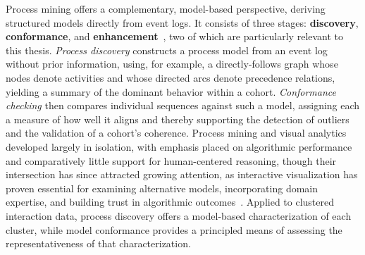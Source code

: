 Process mining offers a complementary, model-based perspective, deriving structured models directly from event logs.
It consists of three stages: \textbf{discovery}, \textbf{conformance}, and \textbf{enhancement}~\cite{Rinderle23Process}, two of which are particularly relevant to this thesis.
\textit{Process discovery} constructs a process model from an event log without prior information, using, for example, a directly-follows graph whose nodes denote activities and whose directed arcs denote precedence relations, yielding a summary of the dominant behavior within a cohort.
\textit{Conformance checking} then compares individual sequences against such a model, assigning each a measure of how well it aligns and thereby supporting the detection of outliers and the validation of a cohort's coherence.
Process mining and visual analytics developed largely in isolation, with emphasis placed on algorithmic performance and comparatively little support for human-centered reasoning, though their intersection has since attracted growing attention, as interactive visualization has proven essential for examining alternative models, incorporating domain expertise, and building trust in algorithmic outcomes~\cite{miksch2024visual}.
Applied to clustered interaction data, process discovery offers a model-based characterization of each cluster, while model conformance provides a principled means of assessing the representativeness of that characterization.


